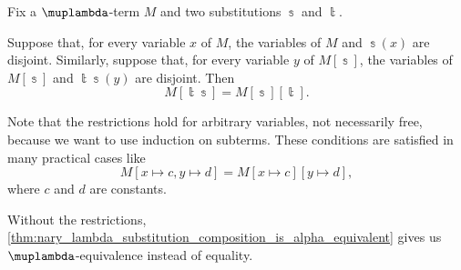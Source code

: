 \begin{proposition}\label{thm:lambda_substitution_composition_term_equality}
  Fix a \( \muplambda \)-term \( M \) and two substitutions \( \Bbbs \) and \( \Bbbt \).

  Suppose that, for every variable \( x \) of \( M \), the variables of \( M \) and \( \Bbbs(x) \) are disjoint. Similarly, suppose that, for every variable \( y \) of \( M[\Bbbs] \), the variables of \( M[\Bbbs] \) and \( \Bbbt\Bbbs(y) \) are disjoint. Then
  \begin{equation}\label{eq:thm:lambda_substitution_composition_term_equality}
    M[\Bbbt\Bbbs] = M[\Bbbs][\Bbbt].
  \end{equation}
\end{proposition}
\begin{comments}
  \item Note that the restrictions hold for arbitrary variables, not necessarily free, because we want to use induction on subterms. These conditions are satisfied in many practical cases like
  \begin{equation*}
    M[x \mapsto c, y \mapsto d] = M[x \mapsto c][y \mapsto d],
  \end{equation*}
  where \( c \) and \( d \) are constants.

  Without the restrictions, \cref{thm:nary_lambda_substitution_composition_is_alpha_equivalent} gives us \( \muplambda \)-equivalence instead of equality.
\end{comments}
